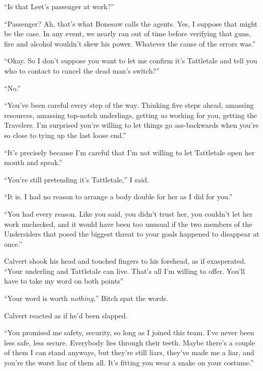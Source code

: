 ``Is that Leet's passenger at work?''



``Passenger?  Ah, that's what Bonesaw calls the agents.  Yes, I suppose that might be the case.  In any event, we nearly ran out of time before verifying that guns, fire and alcohol wouldn't skew his power.  Whatever the cause of the errors was.''



``Okay.  So I don't suppose you want to let me confirm it's Tattletale and tell you who to contact to cancel the dead man's switch?''



``No.''



``You've been careful every step of the way.  Thinking five steps ahead, amassing resources, amassing top-notch underlings, getting \emph{us} working for you, getting the Travelers.  I'm surprised you're willing to let things go ass-backwards when you're so close to tying up the last loose end.''



``It's precisely because I'm careful that I'm not willing to let Tattletale open her mouth and speak.''



``You're still pretending it's Tattletale,'' I said.



``It is.  I had no reason to arrange a body double for her as I did for you.''



``You had every reason.  Like you said, you didn't trust her, you couldn't let her work unchecked, and it would have been too unusual if the two members of the Undersiders that posed the biggest threat to your goals happened to disappear at once.''



Calvert shook his head and touched fingers to his forehead, as if exasperated.  ``Your underling and Tattletale can live.  That's all I'm willing to offer.  You'll have to take my word on both points''



``Your word is worth \emph{nothing},'' Bitch spat the words.



Calvert reacted as if he'd been slapped.



``You promised me safety, security, so long as I joined this team.  I've never been less safe, less secure.  Everybody lies through their teeth.  Maybe there's a couple of them I can stand anyways, but they're still liars, they've made me a liar, and you're the worst liar of them all.  It's fitting you wear a snake on your costume.''



